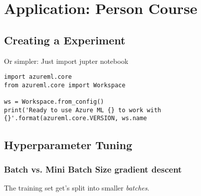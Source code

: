 \section{Application: Person Course}
\subsection{Creating a Experiment}

Or simpler: Just import jupter notebook


\begin{lstlisting}[style=python]
import azureml.core
from azureml.core import Workspace

ws = Workspace.from_config()
print('Ready to use Azure ML {} to work with {}'.format(azureml.core.VERSION, ws.name	
\end{lstlisting}



\subsection{Hyperparameter Tuning} 




\subsubsection{Batch vs. Mini Batch Size gradient descent}

The training set get's split into smaller \textit{batches}.



